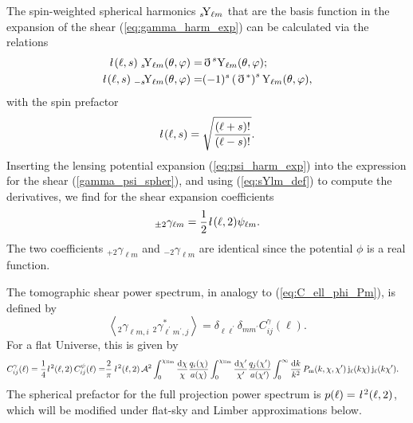 \documentclass[useAMS,usenatbib]{mn2e} %
\newcommand{\ellbar}{\hbox{\it \l}\,}
\newcommand{\pref}{{\cal A}}
\newcommand{\edth}{\,\eth\,}
\begin{document}
%
The spin-weighted spherical harmonics $_s\!{\rm Y}_{\ell m}$ that are the basis function
in the expansion of the shear (\ref{eq:gamma_harm_exp}) can be calculated via the relations
%
%
\begin{align}
  \ellbar(\ell, s) \; _s\!{\rm Y}_{\ell m}(\theta, \varphi) = & \edth^s {\rm Y}_{\ell m}(\theta, \varphi);
    \nonumber \\
  \ellbar(\ell, s) \; _{-s}\!{\rm Y}_{\ell m}(\theta, \varphi) = & (-1)^s \left(\edth^\ast\right)^s {\rm Y}_{\ell m}(\theta, \varphi),
  \label{eq:sYlm_def} 
\end{align}
%
with the spin prefactor \citep{2012PhRvD..86b3001B}
%
\begin{equation}
  \ellbar(\ell, s) = \sqrt{\frac{(\ell + s)!}{(\ell - s)!}}.
\end{equation} 
%
Inserting the lensing potential expansion (\ref{eq:psi_harm_exp}) into the
expression for the shear (\ref{gamma_psi_spher}), and using (\ref{eq:sYlm_def})
to compute the derivatives, we find for the shear expansion coefficients
\citep{2000PhRvD..62d3007H,2001astro.ph.11605T}
%
%
\begin{equation}
  _{\pm 2} \gamma_{\ell m} = \frac 1 2 \ellbar(\ell, 2) \psi_{\ell m}.
  \label{eq:gamma_ellm_phi_ellm}
\end{equation}
%
The two coefficients $_{+2} \gamma_{\ell m}$ and $_{-2} \gamma_{\ell m}$ are
identical since the potential $\phi$ is a real function.

The tomographic shear power spectrum, in analogy to (\ref{eq:C_ell_phi_Pm}), is defined by
%
\begin{equation}
  \left\langle _2\gamma^{}_{\ell m, i} \; {}_2\gamma^\ast_{\ell^\prime m^\prime, j} \right\rangle
    = \delta_{\ell \ell^\prime} \delta_{m m^\prime} C^\gamma_{ij}(\ell).
  \label{eq:C_ell_gamma}
\end{equation}
%
For a flat Universe, this is given by
%
\begin{align}
  C^\gamma_{ij}(\ell) = \frac 1 4 \ellbar^2(\ell, 2) \, C^\psi_{ij}(\ell)
                 = & \frac 2 \pi \, \ellbar^2(\ell, 2) \, \pref^2
                 \int_{0}^{\chi_{\rm lim}} \frac{\rm d \chi}{\chi} \frac{q_i(\chi)}{a(\chi)}
                \int_{0}^{\chi_{\rm lim}} \frac{\rm d \chi^\prime}{\chi^\prime}
                \frac{q_j(\chi^\prime)}{a(\chi^\prime)}
                \int_0^\infty \frac{{\rm d} k}{k^2} \, P_{\rm m}(k, \chi, \chi^\prime) \,
                {\rm j}_\ell(k \chi) \, {\rm j}_\ell(k \chi^\prime) .
  \label{eq:C_ell_full}
\end{align}
%
The spherical prefactor for the full projection power spectrum is $p(\ell) =
\ellbar^2(\ell, 2)$, which will be modified under flat-sky and Limber
approximations below.
\end{document}
